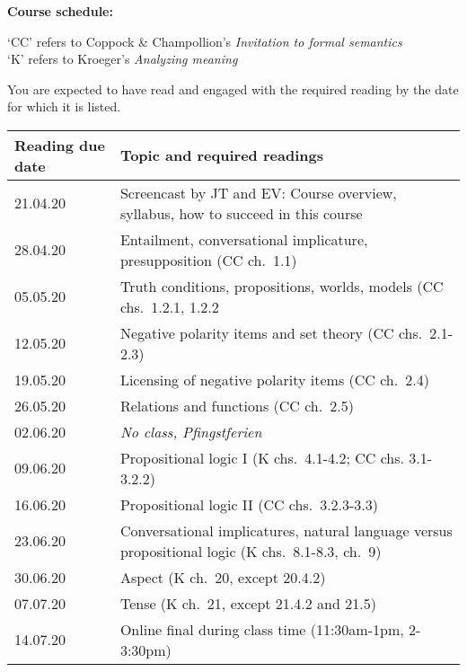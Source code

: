 \documentclass[11pt,fleqn,a4]{article}
\newcommand{\6}{\mbox{$[\hspace*{-.6mm}[$}}
\newcommand{\9}{\mbox{$]\hspace*{-.6mm}]$}}
\begin{document}
{\bf Course schedule:} 

`CC' refers to Coppock \& Champollion's {\em Invitation to formal semantics}
\\
`K' refers to Kroeger's {\em Analyzing meaning}

You are expected to have read and engaged with the required reading by the date for which it is listed.

\begin{longtable}{l l}
{\bf Reading due date} & {\bf Topic and required readings}  \\ \hline

21.04.20 & Screencast by JT and EV: Course overview, syllabus, how to succeed in this course   \\ 

28.04.20 & Entailment, conversational implicature, presupposition (CC ch.\ 1.1) \\

05.05.20 & Truth conditions, propositions, worlds, models (CC chs.\ 1.2.1, 1.2.2 \\

12.05.20 & Negative polarity items and set theory (CC chs.\ 2.1-2.3) \\

19.05.20 & Licensing of negative polarity items (CC ch.\ 2.4) \\

26.05.20 & Relations and functions (CC ch.\ 2.5) \\

02.06.20 & {\em No class, Pfingstferien} \\

09.06.20 & Propositional logic I (K chs.\ 4.1-4.2; CC chs. 3.1-3.2.2)\\

16.06.20 & Propositional logic II (CC chs.\ 3.2.3-3.3) \\

23.06.20 & Conversational implicatures, natural language versus propositional logic (K chs.\ 8.1-8.3, ch.\ 9) \\

30.06.20 & Aspect (K ch.\ 20, except 20.4.2) \\

07.07.20 & Tense (K ch.\ 21, except 21.4.2 and 21.5) \\ 

14.07.20 & Online final during class time (11:30am-1pm, 2-3:30pm) \\

\hline

\end{longtable}
\end{document}
